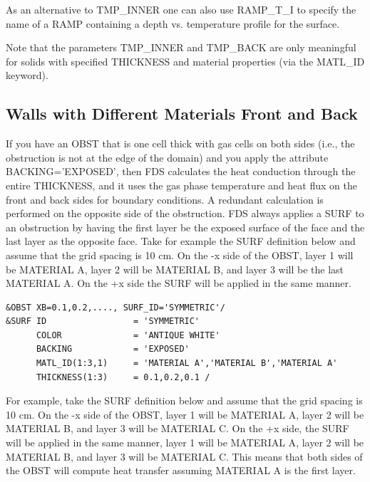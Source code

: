 \documentclass[11pt]{book}
\begin{document}
As an alternative to {\ct TMP\_INNER} one can also use {\ct RAMP\_T\_I} to specify the name of a {\ct RAMP} containing a depth vs. temperature profile for the surface.

Note that the parameters {\ct TMP\_INNER} and {\ct TMP\_BACK} are only meaningful for solids with specified {\ct THICKNESS} and material properties (via the {\ct MATL\_ID} keyword).




\subsection{Walls with Different Materials Front and Back}
\label{info:EXPOSED}

If you have an {\ct OBST} that is one cell thick with gas cells on both sides (i.e., the obstruction is not at the edge of the domain) and you apply the attribute {\ct BACKING='EXPOSED'}, then FDS calculates the heat conduction through the entire {\ct THICKNESS}, and it uses the gas phase temperature and heat flux on the front and back sides for boundary conditions. A redundant calculation is performed on the opposite side of the obstruction.  FDS always applies a {\ct SURF} to an obstruction by having the first layer be the exposed surface of the face and the last layer as the opposite face.  Take for example the {\ct SURF} definition below and assume that the grid spacing is 10 cm.  On the -x side of the {\ct OBST}, layer 1 will be {\ct MATERIAL A}, layer 2 will be {\ct MATERIAL B}, and layer 3 will be the last {\ct MATERIAL A}.  On the +x side the {\ct SURF} will be applied in the same manner.

\begin{lstlisting}
&OBST XB=0.1,0.2,...., SURF_ID='SYMMETRIC'/
&SURF ID                 = 'SYMMETRIC'
      COLOR              = 'ANTIQUE WHITE'
      BACKING            = 'EXPOSED'
      MATL_ID(1:3,1)     = 'MATERIAL A','MATERIAL B','MATERIAL A'
      THICKNESS(1:3)     = 0.1,0.2,0.1 /
\end{lstlisting}

For example, take the {\ct SURF} definition below and assume that the grid spacing is 10 cm.  On the -x side of the {\ct OBST}, layer 1 will be {\ct MATERIAL A}, layer 2 will be {\ct MATERIAL B}, and layer 3 will be {\ct MATERIAL C}.  On the +x side, the {\ct SURF} will be applied in the same manner, layer 1 will be {\ct MATERIAL A}, layer 2 will be {\ct MATERIAL B}, and layer 3 will be {\ct MATERIAL C}.  This means that both sides of the {\ct OBST} will compute heat transfer assuming {\ct MATERIAL A} is the first layer.
\end{document}

